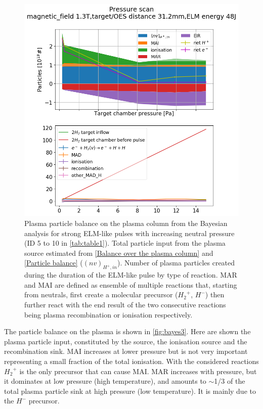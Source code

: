 \begin{figure}[!ht]
        \centering
    	\includegraphics[width=0.7\linewidth,trim={30 260 60 60},clip]{Chapters/chapter3/figs/bayesian_strong_6.png}
	\caption{Plasma particle balance on the plasma column from the Bayesian analysis for strong ELM-like pulses with increasing neutral pressure (ID 5 to 10 in \autoref{tab:table1}). Total particle input from the plasma source estimated from \autoref{Balance over the plasma column} and \ref{Particle balance} ($(nv)_{H^+,in}$). Number of plasma particles created during the duration of the ELM-like pulse by type of reaction. MAR and MAI are defined as ensemble of multiple reactions that, starting from neutrals, first create a molecular precursor (${H_2}^+$, $H^-$) then further react with the end result of the two consecutive reactions being plasma recombination or ionisation respectively.\cite{Verhaegh2020}}
	\label{fig:bayes3}
\end{figure}
The particle balance on the plasma is shown in \autoref{fig:bayes3}.
Here are shown the plasma particle input, constituted by the source, the ionisation source and the recombination sink. MAI increases at lower pressure but is not very important representing a small fraction of the total ionisation. With the considered reactions ${H_2}^+$ is the only precursor that can cause MAI. MAR increases with pressure, but it dominates at low pressure (high temperature), and amounts to $\sim$1/3 of the total plasma particle sink at high pressure (low temperature). It is mainly due to the $H^-$ precursor. 

